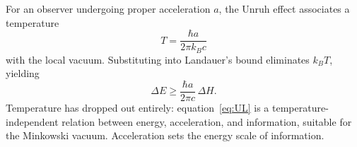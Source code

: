 \documentclass[12pt,a4paper]{article}
\begin{document}
%
% 
% 
% 

For an observer undergoing proper acceleration $a$, the Unruh effect associates a temperature
\begin{equation}
T = \frac{\hbar a}{2 \pi k_B c}
\end{equation}
with the local vacuum. Substituting into Landauer's bound eliminates $k_B T$, yielding
\begin{equation}
\boxed{\Delta E \geq \frac{\hbar a}{2\pi c} \, \Delta H.}
\label{eq:UL}
\end{equation}
Temperature has dropped out entirely: equation~\eqref{eq:UL} is a temperature-independent relation between energy, acceleration, and information, suitable for the Minkowski vacuum. Acceleration sets the energy scale of information. 
\end{document}
